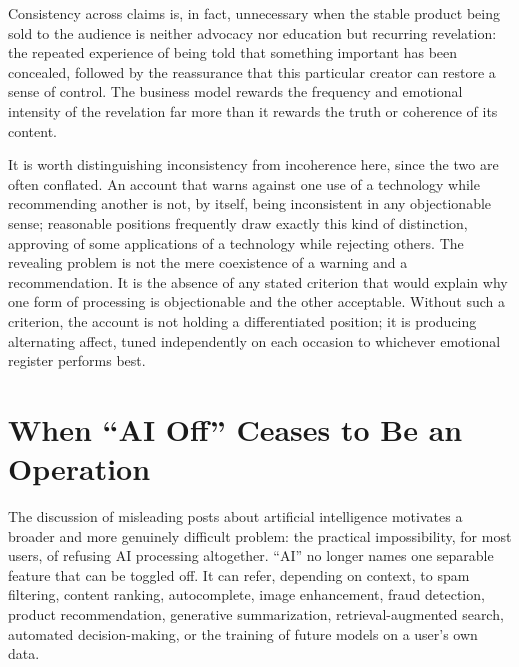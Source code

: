 \documentclass[11pt]{article}
\begin{document}
Consistency across claims is, in fact, unnecessary when the stable product being sold to the audience is neither advocacy nor education but recurring revelation: the repeated experience of being told that something important has been concealed, followed by the reassurance that this particular creator can restore a sense of control. The business model rewards the frequency and emotional intensity of the revelation far more than it rewards the truth or coherence of its content.

It is worth distinguishing inconsistency from incoherence here, since the two are often conflated. An account that warns against one use of a technology while recommending another is not, by itself, being inconsistent in any objectionable sense; reasonable positions frequently draw exactly this kind of distinction, approving of some applications of a technology while rejecting others. The revealing problem is not the mere coexistence of a warning and a recommendation. It is the absence of any stated criterion that would explain why one form of processing is objectionable and the other acceptable. Without such a criterion, the account is not holding a differentiated position; it is producing alternating affect, tuned independently on each occasion to whichever emotional register performs best.

\section{When ``AI Off'' Ceases to Be an Operation}

The discussion of misleading posts about artificial intelligence motivates a broader and more genuinely difficult problem: the practical impossibility, for most users, of refusing AI processing altogether. ``AI'' no longer names one separable feature that can be toggled off. It can refer, depending on context, to spam filtering, content ranking, autocomplete, image enhancement, fraud detection, product recommendation, generative summarization, retrieval-augmented search, automated decision-making, or the training of future models on a user's own data.
\end{document}
